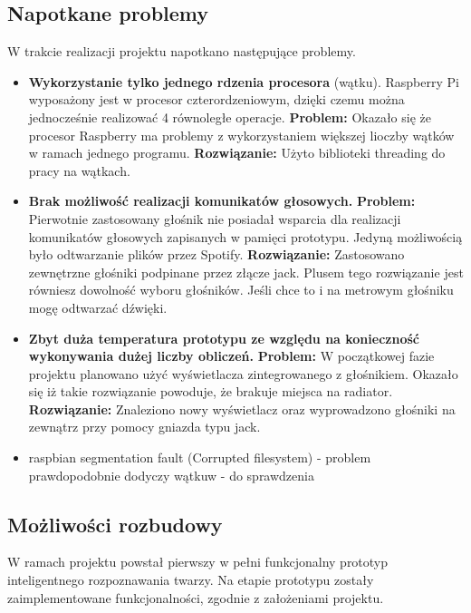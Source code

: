 \documentclass[a4paper,12pt,reqno]{article}
\begin{document}
\subsection{Napotkane problemy}
W trakcie realizacji projektu napotkano następujące problemy.
\begin{itemize}
	\item \textbf{Wykorzystanie tylko jednego rdzenia procesora} (wątku). Raspberry Pi wyposażony jest w procesor czterordzeniowym, dzięki czemu można jednocześnie realizować 4 równoległe operacje. \newline \textbf{Problem:} \newline Okazało się że procesor Raspberry ma problemy z wykorzystaniem większej lioczby wątków w ramach jednego programu. \newline \textbf{Rozwiązanie:} \newline Użyto biblioteki threading do pracy na wątkach.
	\item \textbf{Brak możliwość realizacji komunikatów głosowych.} \newline \textbf{Problem:} \newline Pierwotnie zastosowany głośnik nie posiadał wsparcia dla realizacji komunikatów głosowych zapisanych w pamięci prototypu. Jedyną możliwością było odtwarzanie plików przez Spotify. \newline \textbf{Rozwiązanie:} \newline Zastosowano zewnętrzne głośniki podpinane przez złącze jack. Plusem tego rozwiązanie jest równiesz dowolność wyboru głośników. Jeśli chce to i na metrowym głośniku mogę odtwarzać dźwięki.
	\item \textbf{Zbyt duża temperatura prototypu ze względu na konieczność wykonywania dużej liczby obliczeń.} \newline \textbf{Problem:} \newline W początkowej fazie projektu planowano użyć wyświetlacza zintegrowanego z głośnikiem. Okazało się iż takie rozwiązanie powoduje, że brakuje miejsca na radiator. \newline \textbf{Rozwiązanie:} \newline Znaleziono nowy wyświetlacz oraz wyprowadzono głośniki na zewnątrz przy pomocy gniazda typu jack.
	\item raspbian segmentation fault (Corrupted filesystem) - problem prawdopodobnie dodyczy wątkuw - do sprawdzenia
\end{itemize}

\subsection{Możliwości rozbudowy}
W ramach projektu powstał pierwszy w pełni funkcjonalny prototyp inteligentnego rozpoznawania twarzy. Na etapie prototypu zostały zaimplementowane funkcjonalności, zgodnie z założeniami projektu.
\end{document}
